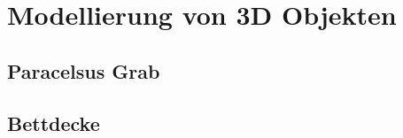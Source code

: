 \section{Modellierung von 3D Objekten}
\label{sec:Modellierung_von_3D_Objekten}
\subsection{Paracelsus Grab}
\subsection{Bettdecke}
